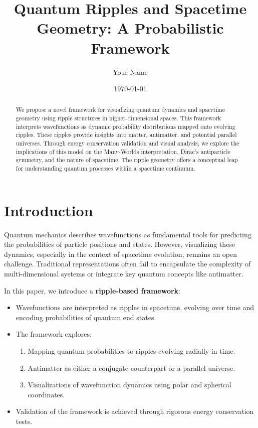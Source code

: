 \documentclass[12pt]{article}
\title{Quantum Ripples and Spacetime Geometry: A Probabilistic Framework}
\author{Your Name}
\date{\today}
\begin{document}
\maketitle

\begin{abstract}
We propose a novel framework for visualizing quantum dynamics and spacetime geometry using ripple structures in higher-dimensional spaces. 
This framework interprets wavefunctions as dynamic probability distributions mapped onto evolving ripples. These ripples provide insights 
into matter, antimatter, and potential parallel universes. Through energy conservation validation and visual analysis, we explore the 
implications of this model on the Many-Worlds interpretation, Dirac’s antiparticle symmetry, and the nature of spacetime. The ripple 
geometry offers a conceptual leap for understanding quantum processes within a spacetime continuum.
\end{abstract}

\tableofcontents

\section{Introduction}
Quantum mechanics describes wavefunctions as fundamental tools for predicting the probabilities of particle positions and states. However, visualizing these dynamics, especially in the context of spacetime evolution, remains an open challenge. Traditional representations often fail to encapsulate the complexity of multi-dimensional systems or integrate key quantum concepts like antimatter.

In this paper, we introduce a \textbf{ripple-based framework}:
\begin{itemize}
    \item Wavefunctions are interpreted as ripples in spacetime, evolving over time and encoding probabilities of quantum end states.
    \item The framework explores:
    \begin{enumerate}
        \item Mapping quantum probabilities to ripples evolving radially in time.
        \item Antimatter as either a conjugate counterpart or a parallel universe.
        \item Visualizations of wavefunction dynamics using polar and spherical coordinates.
    \end{enumerate}
    \item Validation of the framework is achieved through rigorous energy conservation tests.
\end{itemize}
\end{document}
